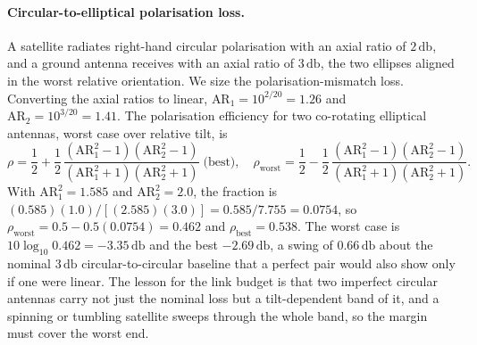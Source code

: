 \paragraph{Circular-to-elliptical polarisation loss.}
A satellite radiates right-hand circular polarisation with an axial ratio
of $2\,\si{\decibel}$, and a ground antenna receives with an axial ratio of
$3\,\si{\decibel}$, the two ellipses aligned in the worst relative
orientation. We size the polarisation-mismatch loss. Converting the axial
ratios to linear, $\text{AR}_1 = 10^{2/20} = 1.26$ and $\text{AR}_2 =
10^{3/20} = 1.41$. The polarisation efficiency for two co-rotating
elliptical antennas, worst case over relative tilt, is
\[
\rho = \frac{1}{2} + \frac{1}{2}\,\frac{(\text{AR}_1^2-1)(\text{AR}_2^2-1)}
{(\text{AR}_1^2+1)(\text{AR}_2^2+1)}\;\text{(best)}, \quad
\rho_{\text{worst}} = \frac{1}{2} - \frac{1}{2}\,\frac{(\text{AR}_1^2-1)
(\text{AR}_2^2-1)}{(\text{AR}_1^2+1)(\text{AR}_2^2+1)}.
\]
With $\text{AR}_1^2 = 1.585$ and $\text{AR}_2^2 = 2.0$, the fraction is
$(0.585)(1.0)/[(2.585)(3.0)] = 0.585/7.755 = 0.0754$, so $\rho_{\text{worst}}
= 0.5 - 0.5(0.0754) = 0.462$ and $\rho_{\text{best}} = 0.538$. The worst
case is $10\log_{10}0.462 = -3.35\,\si{\decibel}$ and the best
$-2.69\,\si{\decibel}$, a swing of $0.66\,\si{\decibel}$ about the nominal
$3\,\si{\decibel}$ circular-to-circular baseline that a perfect pair would
also show only if one were linear. The lesson for the link budget is that
two imperfect circular antennas carry not just the nominal loss but a
tilt-dependent band of it, and a spinning or tumbling satellite sweeps
through the whole band, so the margin must cover the worst end.

